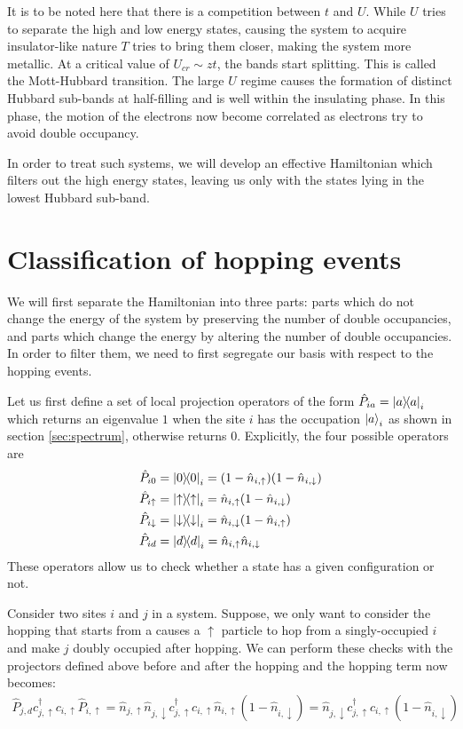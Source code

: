 \documentclass[]{report}
\begin{document}
It is to be noted here that there is a competition between $ t $ and $ U $. While $ U $ tries to separate the high and low energy states, causing the system to acquire insulator-like nature $ T $ tries to bring them closer, making the system more metallic. At a critical value of $ U_{cr} \sim zt $, the bands start splitting. This is called the Mott-Hubbard transition. The large $ U $ regime causes the formation of distinct Hubbard sub-bands at half-filling and is well within the insulating phase. In this phase, the motion of the electrons now become correlated as electrons try to avoid double occupancy.

In order to treat such systems, we will develop an effective Hamiltonian which filters out the high energy states, leaving us only with the states lying in the lowest Hubbard sub-band.

\section{Classification of hopping events}
We will first separate the Hamiltonian into three parts: parts which do not change the energy of the system by preserving the number of double occupancies, and parts which change the energy by altering the number of double occupancies. In order to filter them, we need to first segregate our basis with respect to the hopping events.

Let us first define a set of local projection operators of the form $ \hat{P}_{i a} = \op{a}_{i} $ which returns an eigenvalue $ 1 $ when the site $ i $ has the occupation $ \ket{a}_i $ as shown in section \ref{sec:spectrum}, otherwise returns 0. Explicitly, the four possible operators are
\begin{align}\label{eqn:projectors}
	\nonumber
	\hat{P}_{i 0} &= \op{0}_i = (1 - \hat{n}_{i, \uparrow})(1 - \hat{n}_{i, \downarrow})\\
	\nonumber
	\hat{P}_{i \uparrow} &= \op{\uparrow}_i = \hat{n}_{i, \uparrow} (1 - \hat{n}_{i, \downarrow})\\
	\nonumber
	\hat{P}_{i \downarrow} &= \op{\downarrow}_i = \hat{n}_{i, \downarrow} (1 - \hat{n}_{i, \uparrow})\\
	\hat{P}_{i d} &= \op{d}_i = \hat{n}_{i, \uparrow} \hat{n}_{i, \downarrow}
\end{align}
These operators allow us to check whether a state has a given configuration or not.

Consider two sites $ i $ and $ j $ in a system. Suppose, we only want to consider the hopping that starts from a  causes a $ \uparrow $ particle to hop from a singly-occupied $ i $ and make $ j $ doubly occupied after hopping. We can perform these checks with the projectors defined above before and after the hopping and the hopping term now becomes:
\begin{align}
	\hat{P}_{j, d} c^{\dagger}_{j, \uparrow} c_{i, \uparrow} \hat{P}_{i, \uparrow} = \hat{n}_{j, \uparrow}\hat{n}_{j, \downarrow} c^{\dagger}_{j, \uparrow} c_{i, \uparrow} \hat{n}_{i, \uparrow} (1 - \hat{n}_{i, \downarrow}) = \hat{n}_{j, \downarrow} c^{\dagger}_{j, \uparrow} c_{i, \uparrow} (1 - \hat{n}_{i, \downarrow})
\end{align}
\end{document}
